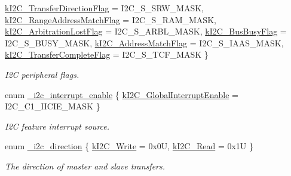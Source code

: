 \begin{DoxyCompactItemize}
\mbox{\hyperlink{group__i2c__driver_gga1f1337bbe9d0b184d9dcee31f9ebade2a249f698970909f33b1b96139c05bd969}{k\+I2\+C\+\_\+\+Transfer\+Direction\+Flag}} = I2\+C\+\_\+\+S\+\_\+\+S\+R\+W\+\_\+\+M\+A\+SK, 
\mbox{\hyperlink{group__i2c__driver_gga1f1337bbe9d0b184d9dcee31f9ebade2aac2c3a26d38c01fba1554eddc0c6b8b5}{k\+I2\+C\+\_\+\+Range\+Address\+Match\+Flag}} = I2\+C\+\_\+\+S\+\_\+\+R\+A\+M\+\_\+\+M\+A\+SK, 
\newline
\mbox{\hyperlink{group__i2c__driver_gga1f1337bbe9d0b184d9dcee31f9ebade2a39fab5ef04e74d00ef4c4574899ab589}{k\+I2\+C\+\_\+\+Arbitration\+Lost\+Flag}} = I2\+C\+\_\+\+S\+\_\+\+A\+R\+B\+L\+\_\+\+M\+A\+SK, 
\mbox{\hyperlink{group__i2c__driver_gga1f1337bbe9d0b184d9dcee31f9ebade2a37fb20742a15a63c1bc2551b997cdcff}{k\+I2\+C\+\_\+\+Bus\+Busy\+Flag}} = I2\+C\+\_\+\+S\+\_\+\+B\+U\+S\+Y\+\_\+\+M\+A\+SK, 
\mbox{\hyperlink{group__i2c__driver_gga1f1337bbe9d0b184d9dcee31f9ebade2a10cd5797b1b8f809192423486a85d5fe}{k\+I2\+C\+\_\+\+Address\+Match\+Flag}} = I2\+C\+\_\+\+S\+\_\+\+I\+A\+A\+S\+\_\+\+M\+A\+SK, 
\mbox{\hyperlink{group__i2c__driver_gga1f1337bbe9d0b184d9dcee31f9ebade2adb8f10365dfc2a3e849f05173fa4d83e}{k\+I2\+C\+\_\+\+Transfer\+Complete\+Flag}} = I2\+C\+\_\+\+S\+\_\+\+T\+C\+F\+\_\+\+M\+A\+SK
 \}
\begin{DoxyCompactList}\small\item\em I2C peripheral flags. \end{DoxyCompactList}\item 
enum \mbox{\hyperlink{group__i2c__driver_ga87c81dd985dad07dc26cb93125a94ec7}{\+\_\+i2c\+\_\+interrupt\+\_\+enable}} \{ \mbox{\hyperlink{group__i2c__driver_gga87c81dd985dad07dc26cb93125a94ec7a5526e27ef6e8317ba928849da890b3b2}{k\+I2\+C\+\_\+\+Global\+Interrupt\+Enable}} = I2\+C\+\_\+\+C1\+\_\+\+I\+I\+C\+I\+E\+\_\+\+M\+A\+SK
 \}
\begin{DoxyCompactList}\small\item\em I2C feature interrupt source. \end{DoxyCompactList}\item 
enum \mbox{\hyperlink{group__i2c__driver_ga1625497320644ba123718bafdd2c1f39}{\+\_\+i2c\+\_\+direction}} \{ \mbox{\hyperlink{group__i2c__driver_gga1625497320644ba123718bafdd2c1f39a93b476b469c2a4bfed5916b458ae9bb0}{k\+I2\+C\+\_\+\+Write}} = 0x0U, 
\mbox{\hyperlink{group__i2c__driver_gga1625497320644ba123718bafdd2c1f39a3a7bb24dc8d1c1be8925603eeafe9b30}{k\+I2\+C\+\_\+\+Read}} = 0x1U
 \}
\begin{DoxyCompactList}\small\item\em The direction of master and slave transfers. \end{DoxyCompactList}\item 

\end{DoxyCompactItemize}
